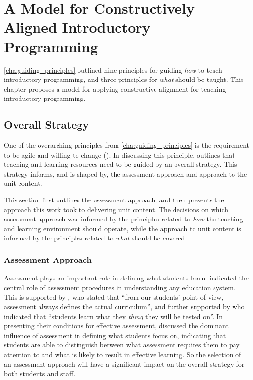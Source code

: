 
\chapter{A Model for Constructively Aligned Introductory Programming} %
\label{cha:approach}

\graphicspath{{Figures/CAApproach/}}

\cref{cha:guiding_principles} outlined nine principles for guiding \emph{how} to teach introductory programming, and three principles for \emph{what} should be taught. This chapter proposes a model for applying constructive alignment for teaching introductory programming.

\section{Overall Strategy} %
\label{sec:overall_strategy}

One of the overarching principles from \cref{cha:guiding_principles} is the requirement to be agile and willing to change (). In discussing this principle,  outlines that teaching and learning resources need to be guided by an overall strategy. This strategy informs, and is shaped by, the assessment approach and approach to the unit content.

This section first outlines the assessment approach, and then presents the approach this work took to delivering unit content. The decisions on which assessment approach was informed by the principles related to \emph{how} the teaching and learning environment should operate, while the approach to unit content is informed by the principles related to \emph{what} should be covered.

\subsection{Assessment Approach} %
\label{sub:assessment_approach}

Assessment plays an important role in defining what students learn. \citet{Rowntree:1977} indicated the central role of assessment procedures in understanding any education system. This is supported by \citet{Ramsden:2003}, who stated that ``from our students' point of view, assessment always defines the actual curriculum'', and further supported by \citet{Biggs:2007} who indicated that ``students learn what they \emph{thing} they will be tested on''. In presenting their conditions for effective assessment, \citet{Gibbs:2004} discussed the dominant influence of assessment in defining what students focus on, indicating that students are able to distinguish between what assessment requires them to pay attention to and what is likely to result in effective learning. So the selection of an assessment approach will have a significant impact on the overall strategy for both students and staff. 

